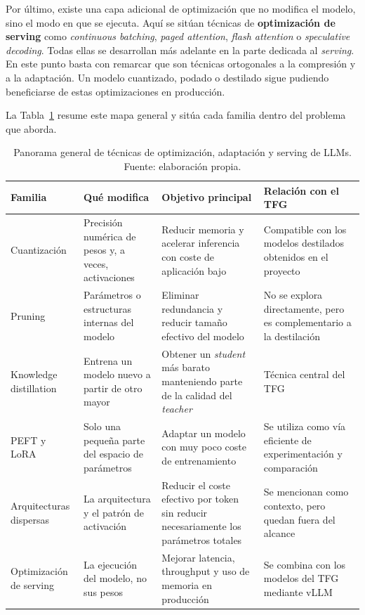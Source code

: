 Por último, existe una capa adicional de optimización que no modifica el modelo, sino el modo en que se ejecuta. Aquí se sitúan técnicas de \textbf{optimización de serving} como \textit{continuous batching}, \textit{paged attention}, \textit{flash attention} o \textit{speculative decoding}. Todas ellas se desarrollan más adelante en la parte dedicada al \textit{serving}. En este punto basta con remarcar que son técnicas ortogonales a la compresión y a la adaptación. Un modelo cuantizado, podado o destilado sigue pudiendo beneficiarse de estas optimizaciones en producción.

La Tabla~\ref{tab:panorama-optimizacion} resume este mapa general y sitúa cada familia dentro del problema que aborda.

\begin{table}[H]
\centering
\caption{Panorama general de técnicas de optimización, adaptación y serving de LLMs. Fuente: elaboración propia.}
\label{tab:panorama-optimizacion}
\footnotesize
\begin{tabularx}{\textwidth}{>{\raggedright\arraybackslash}p{2.8cm} >{\raggedright\arraybackslash}p{2.9cm} >{\raggedright\arraybackslash}X >{\raggedright\arraybackslash}p{3.5cm}}
\toprule
\textbf{Familia} & \textbf{Qué modifica} & \textbf{Objetivo principal} & \textbf{Relación con el TFG} \\
\midrule
Cuantización & Precisión numérica de pesos y, a veces, activaciones & Reducir memoria y acelerar inferencia con coste de aplicación bajo & Compatible con los modelos destilados obtenidos en el proyecto \\
\addlinespace
Pruning & Parámetros o estructuras internas del modelo & Eliminar redundancia y reducir tamaño efectivo del modelo & No se explora directamente, pero es complementario a la destilación \\
\addlinespace
Knowledge distillation & Entrena un modelo nuevo a partir de otro mayor & Obtener un \textit{student} más barato manteniendo parte de la calidad del \textit{teacher} & Técnica central del TFG \\
\addlinespace
PEFT y LoRA & Solo una pequeña parte del espacio de parámetros & Adaptar un modelo con muy poco coste de entrenamiento & Se utiliza como vía eficiente de experimentación y comparación \\
\addlinespace
Arquitecturas dispersas & La arquitectura y el patrón de activación & Reducir el coste efectivo por token sin reducir necesariamente los parámetros totales & Se mencionan como contexto, pero quedan fuera del alcance \\
\addlinespace
Optimización de serving & La ejecución del modelo, no sus pesos & Mejorar latencia, throughput y uso de memoria en producción & Se combina con los modelos del TFG mediante vLLM \\
\bottomrule
\end{tabularx}
\end{table}

